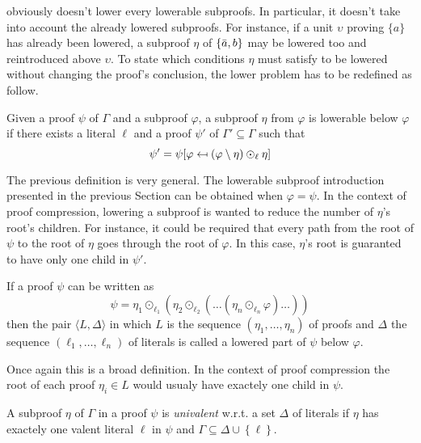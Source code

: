 \documentclass{llncs}
\begin{document}
{\LowerUnits} obviously doesn't lower every lowerable subproofs. In particular, it doesn't take into
account the already lowered subproofs. For instance, if a unit $\upsilon$ proving $\{a\}$ has
already been lowered, a subproof $\eta$ of $\{\bar{a},b\}$ may be lowered too and reintroduced
above $\upsilon$. To state which conditions $\eta$ must satisfy to be lowered without changing the
proof's conclusion, the lower problem has to be redefined as follow.

\begin{definition}
Given a proof $\psi$ of $\Gamma$ and a subproof $\varphi$, a subproof $\eta$ from $\varphi$ is lowerable
below $\varphi$ if there exists a literal $\ell$ and a proof $\psi'$ of $\Gamma' \subseteq
\Gamma$ such that
\begin{equation}
  \psi' = \psi[\varphi \mapsfrom \left(\varphi \setminus \eta\right) \odot_\ell \eta]
\end{equation}
\end{definition}
The previous definition is very general. The lowerable subproof introduction presented in the
previous Section can be obtained when $\varphi = \psi$. In the context of proof compression,
lowering a subproof is wanted to reduce the number of $\eta$'s root's children. For instance, it
could be required that every path from the root of $\psi$ to the root of $\eta$ goes through the
root of $\varphi$. In this case, $\eta$'s root is guaranted to have only one child in $\psi'$.

\begin{definition}
If a proof $\psi$ can be written as
\begin{equation}
  \psi = \eta_1 \odot_{\ell_1} ( \eta_2 \odot_{\ell_2} ( \ldots (\eta_n \odot_{\ell_n} \varphi)
          \ldots ))
\end{equation}
then the pair $\langle L,\Delta \rangle$ in which $L$ is the sequence $(\eta_1,\ldots,\eta_n)$ of
proofs and $\Delta$ the sequence $(\ell_1,\ldots,\ell_n)$ of literals is called a lowered part of
$\psi$ below $\varphi$.
\end{definition}
Once again this is a broad definition. In the context of proof compression the root of each proof
$\eta_i \in L$ would usualy have exactely one child in $\psi$.

\begin{definition}
A subproof $\eta$ of $\Gamma$ in a proof $\psi$ is \emph{univalent} w.r.t. a set $\Delta$ of literals if $\eta$ has
exactely one valent literal $\ell$ in $\psi$ and $\Gamma \subseteq \Delta \cup \left\{ \ell
\right\}$.
\end{definition}
\end{document}
